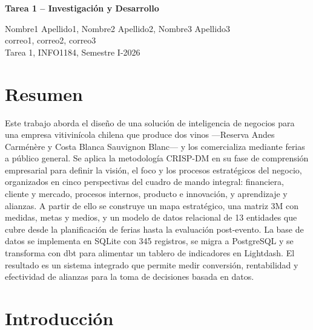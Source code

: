 \documentclass[10pt,a4paper]{article}
\begin{document}
\begin{center}
    {\Large \textbf{Tarea 1 -- Investigaci\'on y Desarrollo}}

    \vspace{0.4cm}

    Nombre1 Apellido1, Nombre2 Apellido2, Nombre3 Apellido3 \\
    correo1, correo2, correo3 \\
    Tarea 1, INFO1184, Semestre I-2026
\end{center}

\vspace{0.5cm}

\section*{Resumen}

Este trabajo aborda el dise\~no de una soluci\'on de inteligencia de negocios para una empresa vitivin\'icola chilena que produce dos vinos ---Reserva Andes Carm\'en\`ere y Costa Blanca Sauvignon Blanc--- y los comercializa mediante ferias a p\'ublico general. Se aplica la metodolog\'ia CRISP-DM en su fase de comprensi\'on empresarial para definir la visi\'on, el foco y los procesos estrat\'egicos del negocio, organizados en cinco perspectivas del cuadro de mando integral: financiera, cliente y mercado, procesos internos, producto e innovaci\'on, y aprendizaje y alianzas. A partir de ello se construye un mapa estrat\'egico, una matriz 3M con medidas, metas y medios, y un modelo de datos relacional de 13 entidades que cubre desde la planificaci\'on de ferias hasta la evaluaci\'on post-evento. La base de datos se implementa en SQLite con 345 registros, se migra a PostgreSQL y se transforma con dbt para alimentar un tablero de indicadores en Lightdash. El resultado es un sistema integrado que permite medir conversi\'on, rentabilidad y efectividad de alianzas para la toma de decisiones basada en datos.

\section{Introducci\'on}
\end{document}

